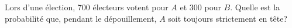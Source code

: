 \begin{exercice}
    Lors d'une élection, 700 électeurs votent pour $A$ et 300 pour $B$. Quelle est la probabilité que, pendant le dépouillement, $A$ soit toujours strictement en tête?
\end{exercice}
